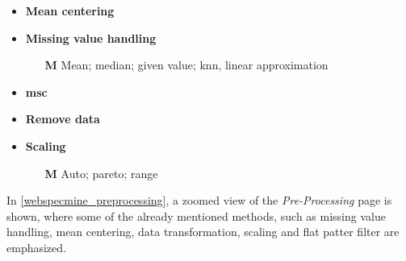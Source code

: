 \begin{multicols}{2}
\begin{itemize}
\begin{itemize}
		\end{itemize}	
		\item \textbf{Mean centering}
		\item \textbf{Missing value handling}
		\begin{itemize}
			\item[\textbf{M}] Mean; median; given value; \gls{knn}, linear approximation
		\end{itemize}
		\item \textbf{\acrlong{msc}}
		\item \textbf{Remove data}	
		\item \textbf{Scaling}
		\begin{itemize}
			\item[\textbf{M}] Auto; pareto; range
		\end{itemize}				
	\end{itemize}
\end{multicols}



In \autoref{webspecmine_preprocessing}, a zoomed view of the \textit{Pre-Processing} page is shown, where some of the already mentioned methods, such as missing value handling, mean centering, data transformation, scaling and flat patter filter are emphasized.

